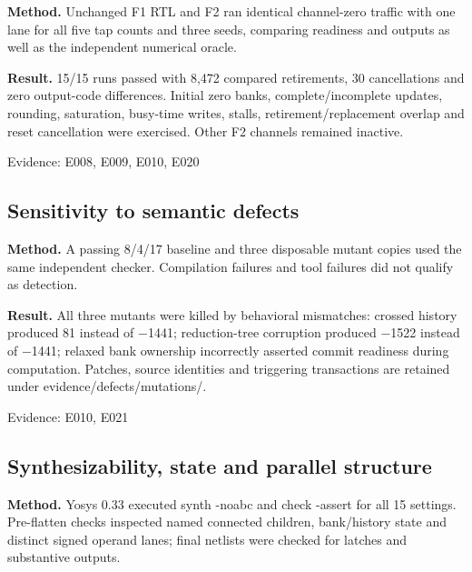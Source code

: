 \documentclass[11pt,a4paper]{article}
\begin{document}
\textbf{Method.} Unchanged F1 RTL and F2 ran identical channel-zero traffic with one lane for all five tap counts and three seeds,\allowbreak{} comparing readiness and outputs as well as the independent numerical oracle.

\textbf{Result.} 15/\allowbreak{}15 runs passed with 8,\allowbreak{}472 compared retirements,\allowbreak{} 30 cancellations and zero output-code differences. Initial zero banks,\allowbreak{} complete/\allowbreak{}incomplete updates,\allowbreak{} rounding,\allowbreak{} saturation,\allowbreak{} busy-time writes,\allowbreak{} stalls,\allowbreak{} retirement/\allowbreak{}replacement overlap and reset cancellation were exercised. Other F2 channels remained inactive.

{\small Evidence: E008,\allowbreak{} E009,\allowbreak{} E010,\allowbreak{} E020}

\subsection{Sensitivity to semantic defects}

\textbf{Method.} A passing 8/\allowbreak{}4/\allowbreak{}17 baseline and three disposable mutant copies used the same independent checker. Compilation failures and tool failures did not qualify as detection.

\textbf{Result.} All three mutants were killed by behavioral mismatches: crossed history produced 81 instead of {\vulcanmathsymbols −}1441; reduction-tree corruption produced {\vulcanmathsymbols −}1522 instead of {\vulcanmathsymbols −}1441; relaxed bank ownership incorrectly asserted commit readiness during computation. Patches,\allowbreak{} source identities and triggering transactions are retained under evidence/\allowbreak{}defects/\allowbreak{}mutations/\allowbreak{}.

{\small Evidence: E010,\allowbreak{} E021}

\subsection{Synthesizability,\allowbreak{} state and parallel structure}

\textbf{Method.} Yosys 0.33 executed synth -noabc and check -assert for all 15 settings. Pre-flatten checks inspected named connected children,\allowbreak{} bank/\allowbreak{}history state and distinct signed operand lanes; final netlists were checked for latches and substantive outputs.
\end{document}
